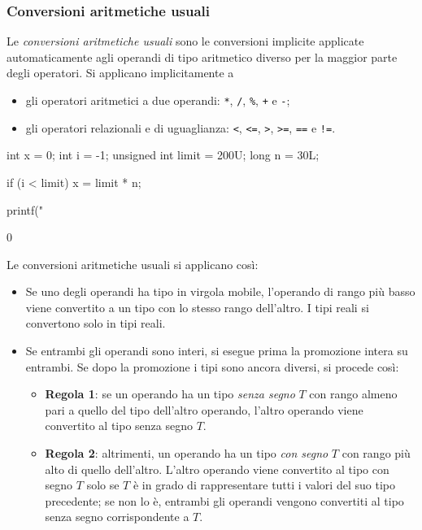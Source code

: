 \documentclass[11pt,a4paper]{article}
\begin{document}
\subsubsection{Conversioni aritmetiche usuali}

Le \emph{conversioni aritmetiche usuali} sono le conversioni implicite applicate automaticamente agli operandi di tipo aritmetico diverso per la maggior parte degli operatori. Si applicano implicitamente a
\begin{itemize}
    \item gli operatori aritmetici a due operandi: \lstinline|*|, \lstinline|/|, \lstinline|%|, \lstinline|+| e \lstinline|-|;
    \item gli operatori relazionali e di uguaglianza: \lstinline|<|, \lstinline|<=|, \lstinline|>|, \lstinline|>=|, \lstinline|==| e \lstinline|!=|.
\end{itemize}

\begin{esempio}
\begin{codice}
int x = 0;
int i = -1;
unsigned int limit = 200U;
long n = 30L;

if (i < limit)
    x = limit * n;

printf("%
\end{codice}
\begin{risultato}
0
\end{risultato}
\end{esempio}

Le conversioni aritmetiche usuali si applicano così:
\begin{itemize}
    \item Se uno degli operandi ha tipo in virgola mobile, l'operando di rango più basso viene convertito a un tipo con lo stesso rango dell'altro. I tipi reali si convertono solo in tipi reali.
    \item Se entrambi gli operandi sono interi, si esegue prima la promozione intera su entrambi. Se dopo la promozione i tipi sono ancora diversi, si procede così:
    \begin{itemize}
        \item \textbf{Regola 1}: se un operando ha un tipo \emph{senza segno} $T$ con rango almeno pari a quello del tipo dell'altro operando, l'altro operando viene convertito al tipo senza segno $T$.
        \item \textbf{Regola 2}: altrimenti, un operando ha un tipo \emph{con segno} $T$ con rango più alto di quello dell'altro. L'altro operando viene convertito al tipo con segno $T$ solo se $T$ è in grado di rappresentare tutti i valori del suo tipo precedente; se non lo è, entrambi gli operandi vengono convertiti al tipo senza segno corrispondente a $T$.
    \end{itemize}
\end{itemize}
\end{document}
